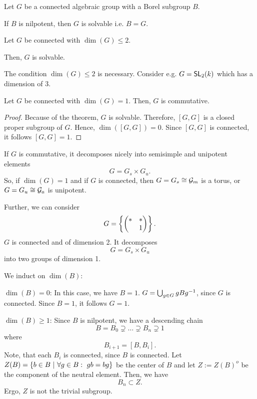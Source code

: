 \begin{lemma}[To be Proved]
	Let $G$ be a connected algebraic group with a Borel subgroup $B$.
	
If $B$ is nilpotent, then $G$ is solvable i.e. $B = G$.
\end{lemma}
\begin{theorem}
	Let $G$ be connected with $\dim(G) \leq 2$.
	
	Then, $G$ is solvable.
\end{theorem}
\begin{example}
	The condition $\dim(G) \leq 2$ is necessary. Consider e.g. $G= \textsf{SL}_2(k)$ which has a dimension of $3$.
\end{example}

\begin{corollary}
	Let $G$ be connected with $\dim(G) = 1$. Then, $G$ is commutative.
\end{corollary}
\begin{proof}
	Because of the theorem, $G$ is solvable. Therefore,
	$[G,G]$ is a closed proper subgroup of $G$. Hence, $\dim([G,G]) = 0$. Since $[G,G]$ is connected, it follows $[G,G] = 1$.
\end{proof}
\begin{remark}
	If $G$ is commutative, it decomposes nicely into semisimple and unipotent elements
	\[ G = G_s \times G_u. \]
	So, if $\dim(G) = 1$ and if $G$ is connected, then $G = G_s\overset{}{\cong} \mathcal{G}_m$ is a torus, or $G = G_u \overset{}{\cong} \mathcal{G}_a$ is unipotent.
	
	Further, we can consider
	\[ G = \left\lbrace\left(\begin{matrix}  * & * \\  & 1 \end{matrix}\right)\right\rbrace. \]
	$G$ is connected and of dimension 2. It decomposes
	\[ G = G_s \times G_u \]
	into two groups of dimension 1.
\end{remark}


\newpage
We induct on $\dim(B)$:

$\dim(B) = 0$: In this case, we have $B = 1$.
$G = \bigcup_{g\in G} gBg^{-1}$, since $G$ is connected. Since $B = 1$, it follows $G = 1$.

$\dim(B) \geq 1$:
Since $B$ is nilpotent, we have a descending chain
\[ B = B_0 \supsetneq \ldots \supsetneq B_n \supsetneq 1 \]
where
\[ B_{i+1} = [B, B_i]. \]
Note, that each $B_i$ is connected, since $B$ is connected.
Let $Z(B) = \left\lbrace b \in B ~ | ~ \forall g \in B:~ gb=bg\right\rbrace$ be the center of $B$ and let $Z:= Z(B)^o$ be the component of the neutral element. Then, we have
\[ B_{n} \subset Z.  \]
Ergo, $Z$ is not the trivial subgroup.

